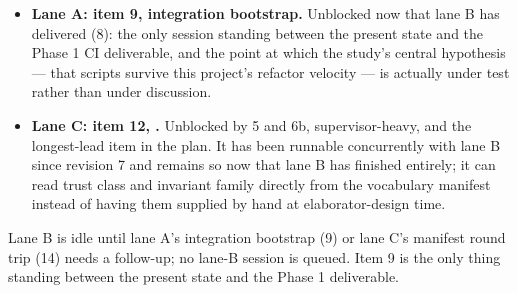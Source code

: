 \begin{itemize}[leftmargin=1.4em]
\item \textbf{Lane A: item 9, integration bootstrap.} Unblocked now
  that lane B has delivered  (8): the only session
  standing between the present state and the Phase 1 CI deliverable,
  and the point at which the study's central hypothesis --- that
  scripts survive this project's refactor velocity --- is actually
  under test rather than under discussion.
\item \textbf{Lane C: item 12, .} Unblocked by 5 and 6b,
  supervisor-heavy, and the longest-lead item in the plan. It has been
  runnable concurrently with lane B since revision 7 and remains so
  now that lane B has finished entirely; it can read trust class and
  invariant family directly from the vocabulary manifest instead of
  having them supplied by hand at elaborator-design time.
\end{itemize}

Lane B is idle until lane A's integration bootstrap (9) or lane C's
manifest round trip (14) needs a follow-up; no lane-B session is
queued. Item 9 is the only thing standing between the present state
and the Phase 1 deliverable.
